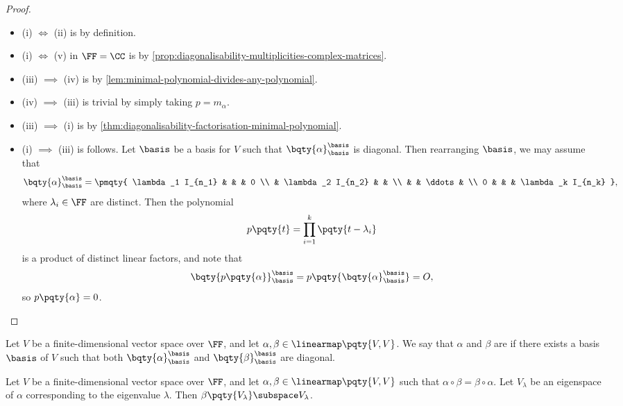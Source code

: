 \begin{proof}
    \begin{itemize}
        \item (i) \(\iff\) (ii) is by definition.
        \item (i) \(\iff\) (v) in \(\FF = \CC\) is by \autoref{prop:diagonalisability-multiplicities-complex-matrices}.
        \item (iii) \(\implies\) (iv) is by \autoref{lem:minimal-polynomial-divides-any-polynomial}.
        \item (iv) \(\implies\) (iii) is trivial by simply taking \(p = m_\alpha\).
        \item (iii) \(\implies\) (i) is by \autoref{thm:diagonalisability-factorisation-minimal-polynomial}.
        \item (i) \(\implies\) (iii) is follows. Let \(\basis\) be a basis for \(V\) such that \(\bqty{\alpha}_{\basis}^{\basis}\) is diagonal. Then rearranging \(\basis\), we may assume that
        \[
            \bqty{\alpha}_{\basis}^{\basis} = \pmqty{
                \lambda_1 I_{n_1} &  & & 0 \\
                 & \lambda_2 I_{n_2} & &  \\
                 & & \ddots & \\
                0 &  &  & \lambda_k I_{n_k}
            },
        \]
        where \(\lambda_i \in \FF\) are distinct. Then the polynomial
        \[
            p\pqty{t} = \prod_{i = 1}^{k} \pqty{t - \lambda_i}
        \]
        is a product of distinct linear factors, and note that
        \[
            \bqty{p\pqty{\alpha}}_{\basis}^{\basis} = p\pqty{\bqty{\alpha}_{\basis}^{\basis}} = O,
        \]
        so \(p\pqty{\alpha} = 0\).
    \end{itemize}
\end{proof}

\begin{definition}
    Let \(V\) be a finite-dimensional vector space over \(\FF\), and let \(\alpha, \beta \in \linearmap\pqty{V, V}\). We say that \(\alpha\) and \(\beta\) are  if there exists a basis \(\basis\) of \(V\) such that both \(\bqty{\alpha}_{\basis}^{\basis}\) and \(\bqty{\beta}_{\basis}^{\basis}\) are diagonal.
\end{definition}

\begin{lemma}
    \label{lem:commuting-endomorphisms-preserves-eigenspaces}%
    Let \(V\) be a finite-dimensional vector space over \(\FF\), and let \(\alpha, \beta \in \linearmap\pqty{V, V}\) such that \(\alpha \circ \beta = \beta \circ \alpha\). Let \(V_{\lambda}\) be an eigenspace of \(\alpha\) corresponding to the eigenvalue \(\lambda\). Then \(\beta\pqty{V_{\lambda}} \subspace V_{\lambda}\).
\end{lemma}

